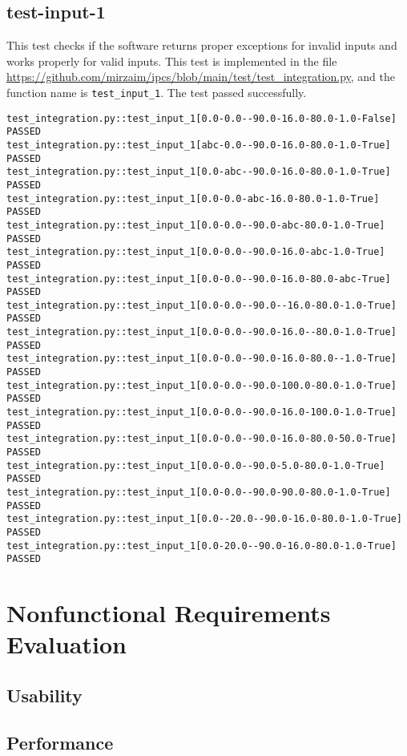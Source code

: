 \documentclass[12pt, titlepage]{article}
\begin{document}
\subsection{test-input-1}
This test checks if the software returns proper exceptions for invalid inputs 
and works properly for valid inputs. This test is implemented in 
the file \url{https://github.com/mirzaim/ipcs/blob/main/test/test_integration.py}, 
and the function name is \texttt{test\_input\_1}. The test passed successfully.

\begin{small}
  \begin{verbatim}
test_integration.py::test_input_1[0.0-0.0--90.0-16.0-80.0-1.0-False]  PASSED
test_integration.py::test_input_1[abc-0.0--90.0-16.0-80.0-1.0-True]   PASSED 
test_integration.py::test_input_1[0.0-abc--90.0-16.0-80.0-1.0-True]   PASSED 
test_integration.py::test_input_1[0.0-0.0-abc-16.0-80.0-1.0-True]     PASSED   
test_integration.py::test_input_1[0.0-0.0--90.0-abc-80.0-1.0-True]    PASSED  
test_integration.py::test_input_1[0.0-0.0--90.0-16.0-abc-1.0-True]    PASSED  
test_integration.py::test_input_1[0.0-0.0--90.0-16.0-80.0-abc-True]   PASSED 
test_integration.py::test_input_1[0.0-0.0--90.0--16.0-80.0-1.0-True]  PASSED
test_integration.py::test_input_1[0.0-0.0--90.0-16.0--80.0-1.0-True]  PASSED
test_integration.py::test_input_1[0.0-0.0--90.0-16.0-80.0--1.0-True]  PASSED
test_integration.py::test_input_1[0.0-0.0--90.0-100.0-80.0-1.0-True]  PASSED
test_integration.py::test_input_1[0.0-0.0--90.0-16.0-100.0-1.0-True]  PASSED
test_integration.py::test_input_1[0.0-0.0--90.0-16.0-80.0-50.0-True]  PASSED
test_integration.py::test_input_1[0.0-0.0--90.0-5.0-80.0-1.0-True]    PASSED  
test_integration.py::test_input_1[0.0-0.0--90.0-90.0-80.0-1.0-True]   PASSED 
test_integration.py::test_input_1[0.0--20.0--90.0-16.0-80.0-1.0-True] PASSED
test_integration.py::test_input_1[0.0-20.0--90.0-16.0-80.0-1.0-True]  PASSED
  \end{verbatim}
\end{small}


\section{Nonfunctional Requirements Evaluation}

\subsection{Usability}
		
\subsection{Performance}
\end{document}
